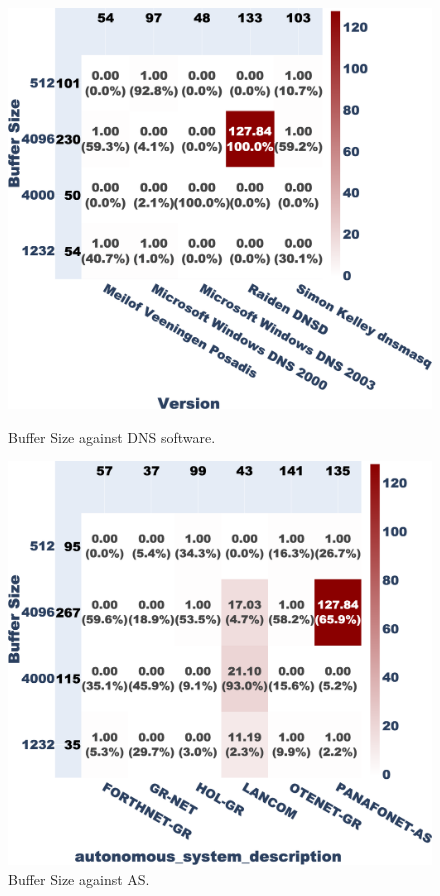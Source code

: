 \begin{figure}[t]
    \centering
    \begin{minipage}[b]{0.2385\textwidth}
        \centering
        \includegraphics[width=\textwidth]{research paper/plots/filtered_Buffer Size_vs_Version_trim.png}
        \caption{Buffer Size against DNS software.}
        \label{fig:heatmap_buffer_version}
    \end{minipage}
    \begin{minipage}[b]{0.2385\textwidth}
        \centering
        \includegraphics[width=\textwidth]{research paper/plots/filtered_Buffer Size_vs_autonomous_system_description_trim.png}
        \caption{Buffer Size against AS.}
        \label{fig:heatmap_buffer_as}
    \end{minipage}
\end{figure}

